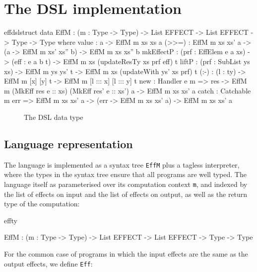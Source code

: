 \section{The \Eff{} DSL implementation}

\label{sect:effimpl}

\begin{SaveVerbatim}{effdslstruct}
data EffM : (m : Type -> Type) -> List EFFECT -> List EFFECT -> Type -> Type where
     value     : a -> EffM m xs xs a
     (>>=)     : EffM m xs xs' a -> (a -> EffM m xs' xs'' b) -> EffM m xs xs'' b
     mkEffectP : (prf : EffElem e a xs) -> (eff : e a b t) -> EffM m xs (updateResTy xs prf eff) t
     liftP     : (prf : SubList ys xs) -> EffM m ys ys' t -> EffM m xs (updateWith ys' xs prf) t
     (:-)      : (l : ty) -> EffM m [x] [y] t -> EffM m [l ::: x] [l ::: y] t
     new       : Handler e m => res -> EffM m (MkEff res e :: xs) (MkEff res' e :: xs') a -> EffM m xs xs' a
     catch     : Catchable m err => EffM m xs xs' a -> (err -> EffM m xs xs' a) -> EffM m xs xs' a
\end{SaveVerbatim}

\begin{figure*}[t]
\begin{center}
\end{center}
\caption{The \Eff{} DSL data type}
\label{effdsltype}
\end{figure*}

\subsection{Language representation}

The \Eff{} language is implemented as a syntax tree \texttt{EffM}
plus a tagless interpreter, where the
types in the syntax tree ensure that all \Eff{} programs are well typed.
The language itself as parameterised over its computation context \texttt{m},
and indexed by the list of effects on input and the list of effects on output,
as well as the return type of the computation:

\begin{SaveVerbatim}{effty}

EffM : (m : Type -> Type) -> 
       List EFFECT -> List EFFECT -> Type -> Type

\end{SaveVerbatim}

\noindent
For the common case of programs in which the input effects are the same as
the output effects, we define \texttt{Eff}:

